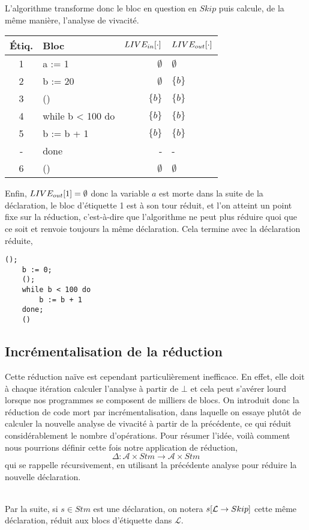 \documentclass[a4paper, 12pt]{article}
\begin{document}
L'algorithme transforme donc le bloc en question en $Skip$ puis calcule, de la même manière, l'analyse de vivacité.
\begin{center}
	\begin{tabular}{||c|l|r|l||}
	\hline
	Étiq. & Bloc & $LIVE_{in}[\cdot]$ & $LIVE_{out}[\cdot]$ \\
	\hline
	1 & a := 1 & $\emptyset$ & $\emptyset$\\
	2 & b := 20 & $\emptyset$ & $\{b\}$\\
	3 & () & $\{b\}$ & $\{b\}$\\
	4 & while b < 100 do & $\{b\}$ & $\{b\}$\\
	5 & b := b + 1 & $\{b\}$ & $\{b\}$\\
	- & done & - & -\\
	6 & () & $\emptyset$ & $\emptyset$\\
	\hline
	\end{tabular}
\end{center}
Enfin, $LIVE_{out}[1] = \emptyset$ donc la variable $a$ est morte dans la suite de la déclaration, le bloc d'étiquette 1 est à son tour
réduit, et l'on atteint un point fixe sur la réduction, c'est-à-dire que l'algorithme ne peut plus réduire quoi que ce soit et renvoie
toujours la même déclaration. Cela termine avec la déclaration réduite,
\begin{lstlisting}[tabsize=2]
	();
	b := 0;
	();
	while b < 100 do
		b := b + 1
	done;
	()
\end{lstlisting}
\subsection{Incrémentalisation de la réduction}
Cette réduction naïve est cependant particulièrement inefficace. En effet, elle doit à chaque itération calculer
l'analyse à partir de $\bot$ et cela peut s'avérer lourd lorsque nos programmes se composent de milliers de blocs.
On introduit donc la réduction de code mort par incrémentalisation, dans laquelle on essaye plutôt de calculer
la nouvelle analyse de vivacité à partir de la précédente, ce qui réduit considérablement le nombre d'opérations.
Pour résumer l'idée, voilà comment nous pourrions définir cette fois notre application de réduction,
\[\Delta : \mathcal{A} \times Stm \longrightarrow \mathcal{A} \times Stm \]
qui se rappelle récursivement, en utilisant la précédente analyse pour réduire la nouvelle déclaration.
\\
\\
\begin{notation}
	Par la suite, si $s \in Stm$ est une déclaration, on notera $s[\mathcal{L} \rightarrow{Skip}]$ cette même déclaration, 
	réduit aux blocs d'étiquette dans $\mathcal{L}$.
\end{notation}
\end{document}
